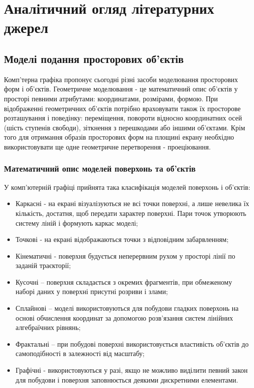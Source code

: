 \let\mypdfximage\pdfximage\def\pdfximage{\immediate\mypdfximage}\documentclass[14pt,a4paper]{extarticle}
\theoremstyle{definition}
\renewcommand{\[}{\begin{singlespace}\begin{equation*}}
\renewcommand{\]}{\end{equation*}\end{singlespace}}
\renewcommand{\+}{\discretionary{\mbox{\scriptsize$\hookleftarrow$}}{}{}}
\begin{document}
\section{Аналітичний огляд літературних джерел}

\subsection{Моделі подання просторових об'єктів}

Комп'терна графіка пропонує сьогодні різні засоби моделювання просторових форм і об'єктів. Геометричне моделювання - це математичний опис об'єктів у просторі певними атрибутами: координатами, розмірами, формою. При відображенні геометричних об'єктів потрібно враховувати також їх просторове розташування і поведінку: переміщення, повороти відносно координатних осей (шість ступенів свободи), зіткнення з перешкодами або іншими об'єктами. Крім того для отримання образів просторових форм на площині екрану необхідно використовувати ще одне геометричне перетворення - проеціювання. 

\subsubsection{Математичний опис моделей поверхонь та об’єктів}

У комп'ютерній графіці прийнята така класифікація моделей поверхонь і об'єктів:
\begin{itemize}
\item Каркасні - на екрані візуалізуються не всі точки поверхні, а лише невелика їх кількість, достатня, щоб передати характер поверхні. Пари точок утворюють  систему ліній і формують каркас моделі;
\item Точкові - на екрані відображаються точки з відповідним забарвленням;
\item Кінематичні - поверхня будується неперервним рухом у просторі лінії по заданій траєкторії;
\item Кусочні – поверхня складається з окремих фрагментів,  при обмеженому наборі даних у поверхні присутні розриви і злами;
\item Сплайнові – моделі використовуються для побудови гладких поверхонь на основі обчислення координат за допомогою розв'язання систем лінійних алгебраїчних рівнянь;
\item Фрактальні – при побудові поверхні використовується властивість об'єктів до самоподібності в залежності від масштабу;
\item Графічні - використовуються у разі, якщо не можливо виділити певний закон для побудови і поверхня заповнюється деякими дискретними елементами.
\end{itemize}
\end{document}
